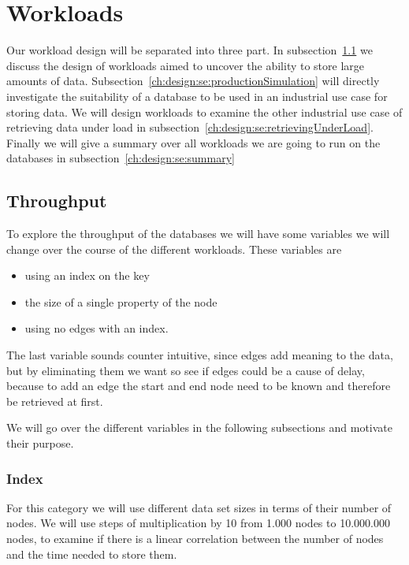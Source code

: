 \section{Workloads}
\label{ch:design:se:workloads}
Our workload design will be separated into three part.
In subsection~\ref{ch:design:se:throughput} we discuss the design of workloads aimed to uncover the ability to store large amounts of data.
Subsection~\ref{ch:design:se:productionSimulation} will directly investigate the suitability of a database to be used in an industrial use case for storing data.
We will design workloads to examine the other industrial use case of retrieving data under load in subsection~\ref{ch:design:se:retrievingUnderLoad}.
Finally we will give a summary over all workloads we are going to run on the databases in subsection~\ref{ch:design:se:summary}

\subsection{Throughput}
\label{ch:design:se:throughput}
To explore the throughput of the databases we will have some variables we will change over the course of the different workloads.
These variables are

\begin{itemize}
  \item using an index on the key
  \item the size of a single property of the node
  \item using no edges with an index.
\end{itemize}

The last variable sounds counter intuitive,
since edges add meaning to the data,
but by eliminating them we want so see if edges could be a cause of delay,
because to add an edge the start and end node need to be known and therefore be retrieved at first.

We will go over the different variables in the following subsections and motivate their purpose.

\subsubsection{Index}
\label{ch:design:se:index}
For this category we will use different data set sizes in terms of their number of nodes.
We will use steps of multiplication by 10 from 1.000 nodes to 10.000.000 nodes,
to examine if there is a linear correlation between the number of nodes and the time needed to store them.

